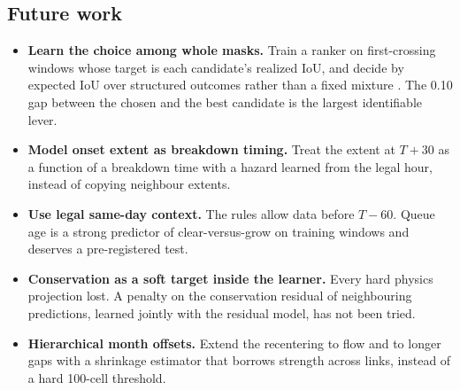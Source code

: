 \subsection{Future work}
\begin{itemize}
  \item \textbf{Learn the choice among whole masks.} Train a ranker on first-crossing windows whose target is each
        candidate's realized IoU, and decide by expected IoU over structured outcomes rather than a fixed mixture
        \cite{nowozin2014}. The 0.10 gap between the chosen and the best candidate is the largest identifiable lever.
  \item \textbf{Model onset extent as breakdown timing.} Treat the extent at $T{+}30$ as a function of a breakdown time with
        a hazard learned from the legal hour, instead of copying neighbour extents.
  \item \textbf{Use legal same-day context.} The rules allow data before $T{-}60$. Queue age is a strong predictor of
        clear-versus-grow on training windows and deserves a pre-registered test.
  \item \textbf{Conservation as a soft target inside the learner.} Every hard physics projection lost. A penalty on the
        conservation residual of neighbouring predictions, learned jointly with the residual model, has not been tried.
  \item \textbf{Hierarchical month offsets.} Extend the recentering to flow and to longer gaps with a shrinkage estimator
        that borrows strength across links, instead of a hard 100-cell threshold.
\end{itemize}
